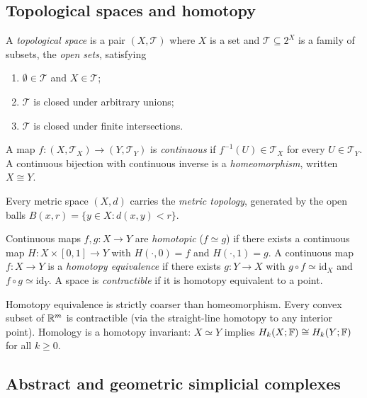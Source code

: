 \subsection{Topological spaces and homotopy}

\begin{definition}
\label{def:topspace}
A \emph{topological space} is a pair $(X,\mathcal{T})$ where $X$ is a set and $\mathcal{T}\subseteq 2^X$ is a family of subsets, the \emph{open sets}, satisfying
\begin{enumerate}[label=(\roman*)]
  \item $\emptyset\in\mathcal{T}$ and $X\in\mathcal{T}$;
  \item $\mathcal{T}$ is closed under arbitrary unions;
  \item $\mathcal{T}$ is closed under finite intersections.
\end{enumerate}
A map $f\colon(X,\mathcal{T}_X)\to(Y,\mathcal{T}_Y)$ is \emph{continuous} if $f^{-1}(U)\in\mathcal{T}_X$ for every $U\in\mathcal{T}_Y$. A continuous bijection with continuous inverse is a \emph{homeomorphism}, written $X\cong Y$.
\end{definition}

Every metric space $(X,d)$ carries the \emph{metric topology}, generated by the open balls $B(x,r)=\{y\in X:d(x,y)<r\}$.

\begin{definition}
\label{def:homotopy}
Continuous maps $f,g\colon X\to Y$ are \emph{homotopic} ($f\simeq g$) if there exists a continuous map $H\colon X\times[0,1]\to Y$ with $H(\cdot,0)=f$ and $H(\cdot,1)=g$. A continuous map $f\colon X\to Y$ is a \emph{homotopy equivalence} if there exists $g\colon Y\to X$ with $g\circ f\simeq\mathrm{id}_X$ and $f\circ g\simeq\mathrm{id}_Y$. A space is \emph{contractible} if it is homotopy equivalent to a point.
\end{definition}

Homotopy equivalence is strictly coarser than homeomorphism. Every convex subset of $\mathbb{R}^m$ is contractible (via the straight-line homotopy to any interior point). Homology is a homotopy invariant: $X\simeq Y$ implies $H_k(X;\mathbb{F})\cong H_k(Y;\mathbb{F})$ for all $k\geq 0$.

\subsection{Abstract and geometric simplicial complexes}

